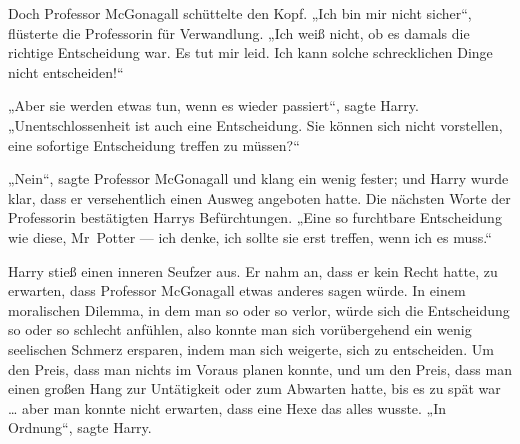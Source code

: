 Doch Professor McGonagall schüttelte den Kopf.
„Ich bin mir nicht sicher“, flüsterte die Professorin für Verwandlung.
„Ich weiß nicht, ob es damals die richtige Entscheidung war. Es tut mir leid. Ich kann solche schrecklichen Dinge nicht entscheiden!“

„Aber sie werden etwas tun, wenn es wieder passiert“, sagte Harry.
„Unentschlossenheit ist auch eine Entscheidung. Sie können sich nicht vorstellen, eine sofortige Entscheidung treffen zu müssen?“

„Nein“, sagte Professor McGonagall und klang ein wenig fester; und Harry wurde klar, dass er versehentlich einen Ausweg angeboten hatte. Die nächsten Worte der Professorin bestätigten Harrys Befürchtungen.
„Eine so furchtbare Entscheidung wie diese, Mr~Potter — ich denke, ich sollte sie erst treffen, wenn ich es muss.“

Harry stieß einen inneren Seufzer aus. Er nahm an, dass er kein Recht hatte, zu erwarten, dass Professor McGonagall etwas anderes sagen würde. In einem moralischen Dilemma, in dem man so oder so verlor, würde sich die Entscheidung so oder so schlecht anfühlen, also konnte man sich vorübergehend ein wenig seelischen Schmerz ersparen, indem man sich weigerte, sich zu entscheiden. Um den Preis, dass man nichts im Voraus planen konnte, und um den Preis, dass man einen großen Hang zur Untätigkeit oder zum Abwarten hatte, bis es zu spät war … aber man konnte nicht erwarten, dass eine Hexe das alles wusste.
„In Ordnung“, sagte Harry.

